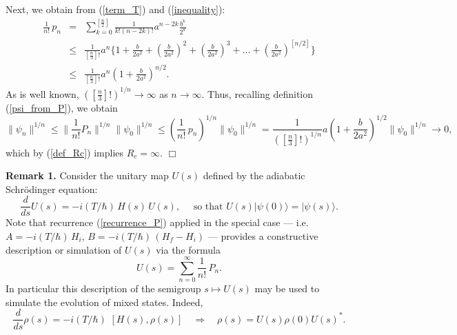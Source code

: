 \documentclass[11 pt]{article}
\begin{document}
 Next,  we obtain from (\ref{term_T}) and (\ref{inequality}):
 \begin{equation}\label{term_T_est}
 \begin{array}{lll}
 \frac{1}{n!} \, p_n &=& \sum\limits_{k=0}^{[\frac{n}{2}]}\frac{1}{k!(n-2k)!} a^{n-2k}\frac{b^k}{2^k} \\
 & \leq & \frac{1}{\left[\frac{n}{3}\right]!}a^n\{1 + \frac{b}{2a^2} + \left(\frac{b}{2a^2}\right)^2  + \left(\frac{b}{2a^2}\right)^3 +\ldots + \left(\frac{b}{2a^2}\right)^{[n/2]}\} \\
 & \leq & \frac{1}{\left[\frac{n}{3}\right]!} a^n (1+ \frac{b}{2a^2})^{n/2}.
 \end{array}
\end{equation}
 As is well known, $\left(\left[\frac{n}{3}\right]!\right) ^{1/n} \rightarrow \infty$ as $n\rightarrow \infty$. Thus, recalling definition (\ref{psi_from_P}), we obtain
 \[
 \|\psi_n\|^{1/n} \leq \|\frac{1}{n!}P_n\|^{1/n} \|\psi_0\|^{1/n}\leq \left(\frac{1}{n!}\,p_n\right)^{1/n} \|\psi_0\|^{1/n} =
 \frac{1}{\left(\left[\frac{n}{3}\right]!\right)^{1/n}} a\left(1+ \frac{b}{2a^2}\right)^{1/2} \|\psi_0\|^{1/n}\rightarrow 0,
 \]
 which by (\ref{def_Rc}) implies $R_c = \infty$. $\Box$
 
 \vspace*{.2cm}

\noindent
\textbf{Remark 1.} Consider the unitary map $U(s)$ defined by the adiabatic Schr\"{o}dinger equation:
\[
\frac{d}{ds} U(s) = -i(T/\hbar)\, H(s)\, U(s), \quad \mbox{ so that } U(s)|\psi (0)\rangle = |\psi (s)\rangle. 
\]
Note that recurrence (\ref{recurrence_P}) applied in the special case --- i.e. $A = -i(T/\hbar)\,H_i$, $B=-i(T/\hbar)\,(H_f-H_i)$ --- provides a constructive description or simulation of $U(s)$ via the formula
\[
U(s) = \sum\limits_{n=0}^\infty \frac{1}{n!}\, P_n.
\]
In particular this description of the semigroup $s\mapsto U(s)$ may be used to simulate the evolution of mixed states. Indeed,
 \[
\frac{d}{ds} \rho(s)= -i(T/\hbar)\, \, [H(s), \rho(s) ]\quad \Longrightarrow\quad \rho(s) = U(s)\rho(0) U(s)^*.
 \]
  \vspace*{.2cm}
\end{document}
